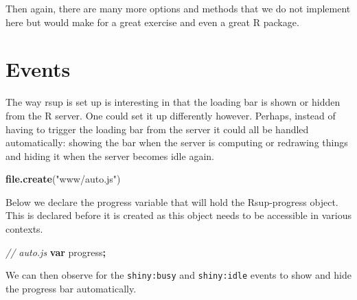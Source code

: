 \documentclass[
]{krantz}
\makeatletter
\newenvironment{Shaded}{\begin{snugshade}}{\end{snugshade}}
\newcommand{\AttributeTok}[1]{\textcolor[rgb]{0.61,0.61,0.61}{#1}}
\newcommand{\CommentTok}[1]{\textcolor[rgb]{0.37,0.37,0.37}{\textit{#1}}}
\newcommand{\KeywordTok}[1]{\textcolor[rgb]{0.27,0.27,0.27}{\textbf{#1}}}
\newcommand{\NormalTok}[1]{#1}
\newcommand{\OperatorTok}[1]{\textcolor[rgb]{0.43,0.43,0.43}{\textbf{#1}}}
\newcommand{\StringTok}[1]{\textcolor[rgb]{0.5,0.5,0.5}{#1}}
\newcommand{\VariableTok}[1]{\textcolor[rgb]{0,0,0}{#1}}
\newenvironment{kframe}{%
\medskip{}
\setlength{\fboxsep}{.8em}
 \def\at@end@of@kframe{}%
 \ifinner\ifhmode%
  \def\at@end@of@kframe{\end{minipage}}%
  \begin{minipage}{\columnwidth}%
 \fi\fi%
 \def\FrameCommand##1{\hskip\@totalleftmargin \hskip-\fboxsep
 \colorbox{shadecolor}{##1}\hskip-\fboxsep
     \hskip-\linewidth \hskip-\@totalleftmargin \hskip\columnwidth}%
 \MakeFramed {\advance\hsize-\width
   \@totalleftmargin\z@ \linewidth\hsize
   \@setminipage}}%
 {\par\unskip\endMakeFramed%
 \at@end@of@kframe}
\renewenvironment{Shaded}{\begin{kframe}}{\end{kframe}}
\makeatother
\begin{document}
Then again, there are many more options and methods that we do not implement here but would make for a great exercise and even a great R package.

\hypertarget{events}{%
\section{Events}\label{events}}

The way rsup is set up is interesting in that the loading bar is shown or hidden from the R server. One could set it up differently however. Perhaps, instead of having to trigger the loading bar from the server it could all be handled automatically: showing the bar when the server is computing or redrawing things and hiding it when the server becomes idle again.

\begin{Shaded}
\begin{Highlighting}[]
\KeywordTok{file.create}\NormalTok{(}\StringTok{"www/auto.js"}\NormalTok{)}
\end{Highlighting}
\end{Shaded}

Below we declare the progress variable that will hold the Rsup-progress object. This is declared before it is created as this object needs to be accessible in various contexts.

\begin{Shaded}
\begin{Highlighting}[]
\CommentTok{// auto.js}
\KeywordTok{var}\NormalTok{ progress}\OperatorTok{;}
\end{Highlighting}
\end{Shaded}

We can then observe for the \texttt{shiny:busy} and \texttt{shiny:idle} events to show and hide the progress bar automatically.

\begin{Shaded}
\end{Shaded}
\end{document}

